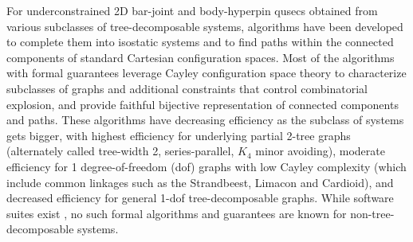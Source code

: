 \medskip\noindent
{}
For underconstrained 2D bar-joint and body-hyperpin qusecs obtained from various subclasses of tree-decomposable systems, algorithms have been developed to complete them into isostatic systems \cite{joan-arinyo2003transforming,sitharam2005combinatorial,gao2006ctree,sitharam2010convex} and to find paths within the connected components \cite{sitharam2011cayleyI,hidalgo2011reachability} of standard Cartesian configuration spaces. Most of the algorithms with formal guarantees leverage Cayley configuration space theory \cite{sitharam2010convex,sitharam2011cayleyI,sitharam2011cayleyII} to characterize subclasses of graphs and additional constraints that control combinatorial explosion, and provide faithful bijective representation of connected components and paths. These algorithms have decreasing efficiency as the subclass of systems gets bigger, with highest efficiency for underlying partial 2-tree graphs (alternately called\cutout{,} tree-width 2, series-parallel,  $K_4$ minor avoiding), moderate efficiency for 1 degree-of-freedom (dof) graphs with low Cayley complexity (which include common linkages such as the Strandbeest, Limacon and Cardioid), and decreased efficiency for general 1-dof tree-decomposable graphs. While software suites exist  \cite{keycurriculum1995geometer,porta2014open,siemens1999d,todd2007geometry}, no such formal algorithms and guarantees are known for non-tree-decomposable systems.


